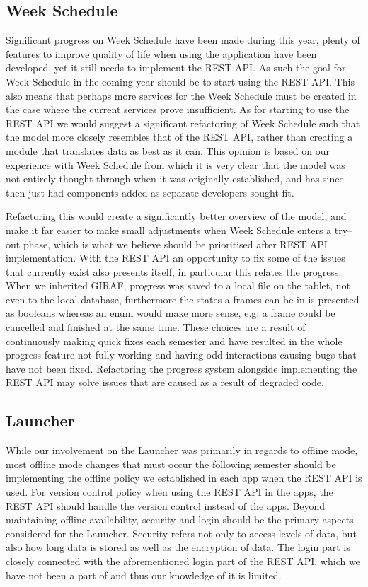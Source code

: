 \subsection*{Week Schedule}
Significant progress on Week Schedule have been made during this year, plenty of features to improve quality of life when using the application have been developed, yet it still needs to implement the REST API.
As such the goal for Week Schedule in the coming year should be to start using the REST API.
This also means that perhaps more services for the Week Schedule must be created in the case where the current services prove insufficient.
As for starting to use the REST API we would suggest a significant refactoring of Week Schedule such that the model more closely resembles that of the REST API, rather than creating a module that translates data as best as it can.
This opinion is based on our experience with Week Schedule from which it is very clear that the model was not entirely thought through when it was originally established, and has since then just had components added as separate developers sought fit.

Refactoring this would create a significantly better overview of the model, and make it far easier to make small adjustments when Week Schedule enters a try--out phase, which is what we believe should be prioritised after REST API implementation.
With the REST API an opportunity to fix some of the issues that currently exist also presents itself, in particular this relates the progress.
When we inherited GIRAF, progress was saved to a local file on the tablet, not even to the local database, furthermore the states a frames can be in is presented as booleans whereas an enum would make more sense, e.g. a frame could be cancelled and finished at the same time.
These choices are a result of continuously making quick fixes each semester and have resulted in the whole progress feature not fully working and having odd interactions causing bugs that have not been fixed.
Refactoring the progress system alongside implementing the REST API may solve issues that are caused as a result of degraded code.

\subsection*{Launcher}
While our involvement on the Launcher was primarily in regards to offline mode, most offline mode changes that must occur the following semester should be implementing the offline policy we established in each app when the REST API is used.
For version control policy when using the REST API in the apps, the REST API should handle the version control instead of the apps.
Beyond maintaining offline availability, security and login should be the primary aspects considered for the Launcher.
Security refers not only to access levels of data, but also how long data is stored as well as the encryption of data.
The login part is closely connected with the aforementioned login part of the REST API, which we have not been a part of and thus our knowledge of it is limited.

